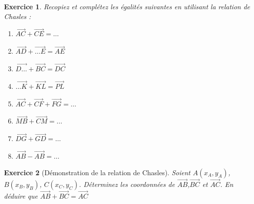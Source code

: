 \documentclass[10pt,a4paper]{article}
\newtheorem{exo}{Exercice}
\begin{document}
\begin{exo}
    Recopiez et complétez les égalités suivantes en utilisant la relation de Chasles :
    \begin{multicols}{2}
        \begin{enumerate}
            \item $\overrightarrow{AC} + \overrightarrow{CE} = \dots$
            \item $\overrightarrow{AD} + \overrightarrow{\dots E} = \overrightarrow{AE}$
            \item $\overrightarrow{D\dots} + \overrightarrow{BC} = \overrightarrow{DC}$
            \item $\overrightarrow{\dots K} + \overrightarrow{KL} = \overrightarrow{PL}$
            \item $\overrightarrow{AC} + \overrightarrow{CF} + \overrightarrow{FG} = \dots$
            \item $\overrightarrow{MB} + \overrightarrow{CM} = \dots$
            \item $\overrightarrow{DG} + \overrightarrow{GD} = \dots$
            \item $\overrightarrow{AB} - \overrightarrow{AB} = \dots$
        \end{enumerate}
        
    \end{multicols}
\end{exo}

\begin{exo}[Démonstration de la relation de Chasles]
    Soient $A(x_A,y_A)$, $B(x_B,y_B)$, $C(x_C,y_C)$.  Déterminez les coordonnées de $\overrightarrow{AB}$,$\overrightarrow{BC}$ et $\overrightarrow{AC}$.  En déduire que $\overrightarrow{AB}+\overrightarrow{BC}=\overrightarrow{AC}$
\end{exo}

\newpage
\end{document}

